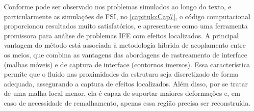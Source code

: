 Conforme pode ser observado nos problemas simulados ao longo do texto, e particularmente as simulações de FSI, no \autoref{capitulo:Cap7}, o código computacional proporcionou resultados muito satisfatórios, e apresenta-se como uma ferramenta promissora para análise de problemas IFE com efeitos localizados. A principal vantagem do método está associada à metodologia híbrida de acoplamento entre os meios, que combina as vantagens das abordagens de rastreamento de interface (malhas móveis) e de captura de interface (contornos imersos). Essa característica permite que o fluido nas proximidades da estrutura seja discretizado de forma adequada, assegurando a captura de efeitos localizados. Além disso, por se tratar de uma malha local menor, ela é capaz de suportar maiores deformações e, em caso de necessidade de remalhamento, apenas essa região precisa ser reconstruída.
